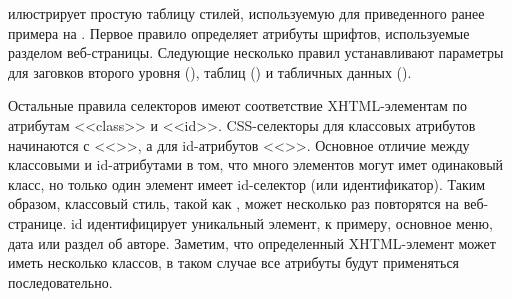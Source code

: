 \documentclass[a4paper,10pt,twoside]{book}
\begin{document}

 илюстрирует простую таблицу стилей,
используемую для приведенного ранее примера на .
Первое правило определяет атрибуты шрифтов,
используемые разделом  веб-страницы.
Следующие несколько правил устанавливают параметры
для заговков второго уровня (), таблиц () и
табличных данных (). 


Остальные правила селекторов имеют соответствие XHTML-элементам по
атрибутам <<class>> и <<id>>.
CSS-селекторы для классовых атрибутов начинаются с <<>>,
а для id-атрибутов <<\ct{#}>>.
Основное отличие между классовыми и id-атрибутами в том,
что много элементов могут имет одинаковый класс,
но только один элемент имеет id-селектор (или идентификатор).
Таким образом, классовый стиль, такой как ,
может несколько раз повторятся на веб-странице.
id идентифицирует уникальный элемент, к примеру,
основное меню, дата или раздел об авторе.
Заметим, что определенный XHTML-элемент может иметь несколько классов,
в таком случае все атрибуты будут применяться последовательно.


\end{document}
